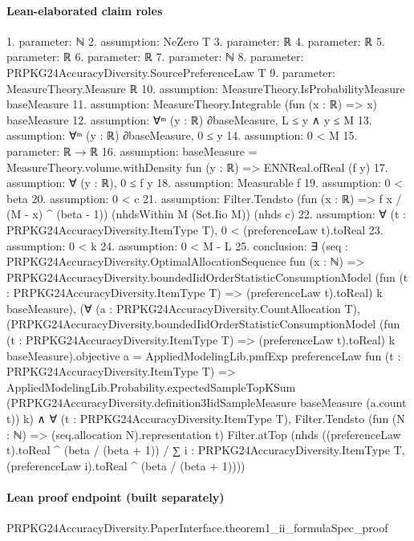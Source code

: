 \documentclass[10pt]{article}
\begin{document}
\paragraph{Lean-elaborated claim roles}\begin{ReviewVerbatim}
1. parameter: ℕ
2. assumption: NeZero T
3. parameter: ℝ
4. parameter: ℝ
5. parameter: ℝ
6. parameter: ℝ
7. parameter: ℕ
8. parameter: PRPKG24AccuracyDiversity.SourcePreferenceLaw T
9. parameter: MeasureTheory.Measure ℝ
10. assumption: MeasureTheory.IsProbabilityMeasure baseMeasure
11. assumption: MeasureTheory.Integrable (fun (x : ℝ) => x) baseMeasure
12. assumption: ∀ᵐ (y : ℝ) ∂baseMeasure, L ≤ y ∧ y ≤ M
13. assumption: ∀ᵐ (y : ℝ) ∂baseMeasure, 0 ≤ y
14. assumption: 0 < M
15. parameter: ℝ → ℝ
16. assumption: baseMeasure = MeasureTheory.volume.withDensity fun (y : ℝ) => ENNReal.ofReal (f y)
17. assumption: ∀ (y : ℝ), 0 ≤ f y
18. assumption: Measurable f
19. assumption: 0 < beta
20. assumption: 0 < c
21. assumption: Filter.Tendsto (fun (x : ℝ) => f x / (M - x) ^ (beta - 1)) (nhdsWithin M (Set.Iio M)) (nhds c)
22. assumption: ∀ (t : PRPKG24AccuracyDiversity.ItemType T), 0 < (preferenceLaw t).toReal
23. assumption: 0 < k
24. assumption: 0 < M - L
25. conclusion: ∃ (seq :
  PRPKG24AccuracyDiversity.OptimalAllocationSequence fun (x : ℕ) =>
    PRPKG24AccuracyDiversity.boundedIidOrderStatisticConsumptionModel
      (fun (t : PRPKG24AccuracyDiversity.ItemType T) => (preferenceLaw t).toReal) k baseMeasure),
  (∀ (a : PRPKG24AccuracyDiversity.CountAllocation T),
      (PRPKG24AccuracyDiversity.boundedIidOrderStatisticConsumptionModel
              (fun (t : PRPKG24AccuracyDiversity.ItemType T) => (preferenceLaw t).toReal) k baseMeasure).objective
          a =
        AppliedModelingLib.pmfExp preferenceLaw fun (t : PRPKG24AccuracyDiversity.ItemType T) =>
          AppliedModelingLib.Probability.expectedSampleTopKSum
            (PRPKG24AccuracyDiversity.definition3IidSampleMeasure baseMeasure (a.count t)) k) ∧
    ∀ (t : PRPKG24AccuracyDiversity.ItemType T),
      Filter.Tendsto (fun (N : ℕ) => (seq.allocation N).representation t) Filter.atTop
        (nhds
          ((preferenceLaw t).toReal ^ (beta / (beta + 1)) /
            ∑ i : PRPKG24AccuracyDiversity.ItemType T, (preferenceLaw i).toReal ^ (beta / (beta + 1))))
\end{ReviewVerbatim}

\paragraph{Lean proof endpoint (built separately)}\begin{ReviewVerbatim}
PRPKG24AccuracyDiversity.PaperInterface.theorem1_ii_formulaSpec_proof
\end{ReviewVerbatim}
\end{document}
